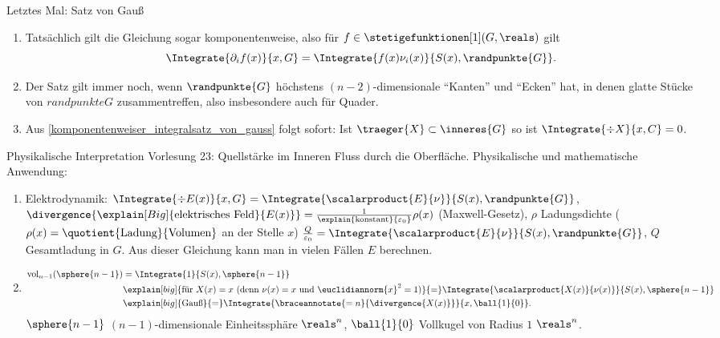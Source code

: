 Letztes Mal: Satz von Gauß
\begin{bemerkungen*}
  \begin{enumerate}[label=\rechtsklammer{\arabic*}, ref=Bemerkung \rechtsklammer{\arabic*}]
    \item \label{komponentenweiser_integralsatz_von_gauss}Tatsächlich gilt die Gleichung sogar komponentenweise, also für \( f\in \stetigefunktionen[1](G,\reals) \) gilt
    \begin{equation*}
      \Integrate{\partial_i f(x)}{x,G}=\Integrate{f(x) \nu_i(x)}{S(x),\randpunkte{G}}.
    \end{equation*}
    \item Der Satz gilt immer noch, wenn \( \randpunkte{G} \) höchstens \( (n-2) \)-dimensionale \enquote{Kanten} und \enquote{Ecken} hat, in denen glatte Stücke von \( randpunkte{G} \) zusammentreffen, also insbesondere auch für Quader.
    \item Aus \ref{komponentenweiser_integralsatz_von_gauss} folgt sofort: Ist \( \traeger{X}\subset \inneres{G} \) so ist \( \Integrate{\div X}{x,C}=0 \).
  \end{enumerate}
\end{bemerkungen*}
Physikalische Interpretation \tto Vorlesung 23: Quellstärke im Inneren \teq Fluss durch die Oberfläche. Physikalische und mathematische Anwendung:
\begin{beispiele}
  \begin{enumerate}
    \item Elektrodynamik: \( \Integrate{\div E(x)}{x,G} =\Integrate{\scalarproduct{E}{\nu}}{S(x),\randpunkte{G}} \), \( \divergence{\explain[Big]{\text{elektrisches Feld}}{E(x)}}=\frac{1}{\explain{\text{konstant}}{\varepsilon_0}}\rho(x) \) (Maxwell-Gesetz), \( \rho \) Ladungsdichte (\( \rho(x) =\quotient{\text{Ladung}}{\text{Volumen}}\) an der Stelle \( x \)) \timplies \( \frac{Q}{\varepsilon_0}=\Integrate{\scalarproduct{E}{\nu}}{S(x),\randpunkte{G}} \), \( Q \) \teq Gesamtladung in \( G \). Aus dieser Gleichung kann man in vielen Fällen \( E \) berechnen.
    \item \begin{align*}
      \operatorname{vol}_{n-1}(\sphere{n-1})&=\Integrate{1}{S(x),\sphere{n-1}}\\
      &\explain[big]{\text{für \( X(x)=x \) (denn \( \nu(x)=x \) und \( \euclidiannorm{x}^2=1 \))}}{=}\Integrate{\scalarproduct{X(x)}{\nu(x)}}{S(x),\sphere{n-1}}\\
      &\explain[big]{\text{Gauß}}{=}\Integrate{\braceannotate{=n}{\divergence{X(x)}}}{x,\ball{1}{0}}.
    \end{align*}
    \( \sphere{n-1} \) \( (n-1) \)-dimensionale Einheitssphäre \tsubset \( \reals^n \), \( \ball{1}{0} \) Vollkugel von Radius \( 1 \) \tsubset \( \reals^n \).
  \end{enumerate}
\end{beispiele}
